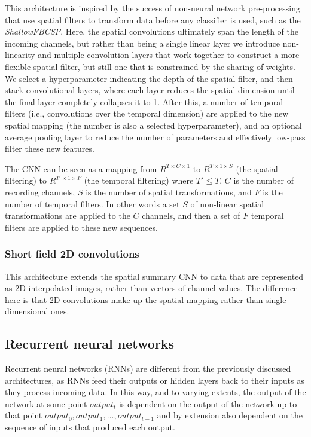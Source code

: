 \documentclass[utf8]{frontiersSCNS} %
\begin{document}
This architecture is inspired by the success of non-neural network pre-processing that use spatial filters to transform data before any classifier is used, such as the \emph{ShallowFBCSP}. Here, the spatial convolutions ultimately span the length of the incoming channels, but rather than being a single linear layer we introduce non-linearity and multiple convolution layers that work together to construct a more flexible spatial filter, but still one that is constrained by the sharing of weights. We select a hyperparameter indicating the depth of the spatial filter, and then stack convolutional layers, where each layer reduces the spatial dimension until the final layer completely collapses it to 1. After this, a number of temporal filters (i.e., convolutions over the temporal dimension) are applied to the new spatial mapping (the number is also a selected hyperparameter), and an optional average pooling layer to reduce the number of parameters and effectively low-pass filter these new features.

The CNN can be seen as a mapping from $R^{T \times C \times 1}$ to $R^{T \times 1 \times S}$ (the spatial filtering) to $R^{T' \times 1 \times F }$ (the temporal filtering) where $T' \leq T$, $C$ is the number of recording channels, $S$ is the number of spatial transformations, and $F$ is the number of temporal filters. In other words a set $S$ of non-linear spatial transformations are applied to the $C$ channels, and then a set of $F$ temporal filters are applied to these new sequences. 

\subsubsection{Short field 2D convolutions}

This architecture extends the spatial summary CNN to data that are represented as 2D interpolated images, rather than vectors of channel values. The difference here is that 2D convolutions make up the spatial mapping rather than single dimensional ones.
 
\subsection{Recurrent neural networks} \label{sec:rnns}

Recurrent neural networks (RNNs) are different from the previously discussed architectures, as RNNs feed their outputs or hidden layers back to their inputs as they process incoming data. In this way, and to varying extents, the output of the network at some point $output_t$ is dependent on the output of the network up to that point $output_0, output_1, ..., output_{t-1}$ and by extension also dependent on the sequence of inputs that produced each output. 
\end{document}

